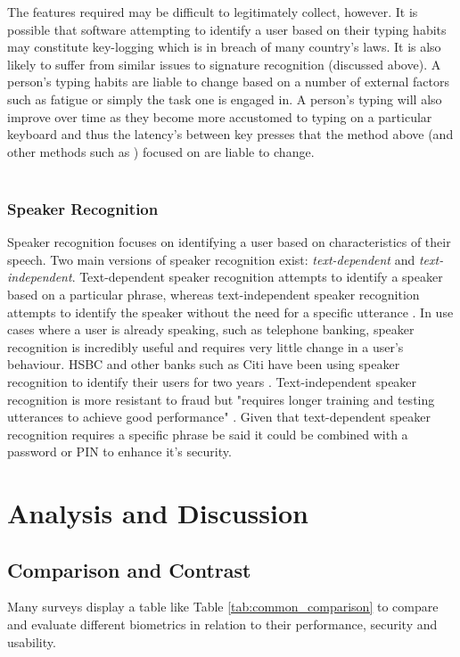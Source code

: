 \documentclass[12pt]{article}
\begin{document}
	The features required may be difficult to legitimately collect, however. It is possible that software attempting to identify a user based on their typing habits may constitute key-logging which is in breach of many country's laws. It is also likely to suffer from similar issues to signature recognition (discussed above). A person's typing habits are liable to change based on a number of external factors such as fatigue or simply the task one is engaged in. A person's typing will also improve over time as they become more accustomed to typing on a particular keyboard and thus the latency's between key presses that the method above (and other methods such as \cite{shepherd_ibm_keystroke_auth1995}) focused on are liable to change.
	\\
	\\
	\subsubsection{Speaker Recognition}
	\label{subsubsect:speaker_recognition}
	Speaker recognition focuses on identifying a user based on characteristics of their speech. Two main versions of speaker recognition exist: \emph{text-dependent} and \emph{text-independent}. Text-dependent speaker recognition attempts to identify a speaker based on a particular phrase, whereas text-independent speaker recognition attempts to identify the speaker without the need for a specific utterance \citep{microsoft_2006}. In use cases where a user is already speaking, such as telephone banking, speaker recognition is incredibly useful and requires very little change in a user's behaviour. HSBC and other banks such as Citi have been using speaker recognition to identify their users for two years \citep{kollewe_2016}. Text-independent speaker recognition is more resistant to fraud \citep{jain2004introduction} but "requires longer training and testing utterances to achieve good performance" \citep{microsoft_2006}. Given that text-dependent speaker recognition requires a specific phrase be said it could be combined with a password or PIN to enhance it's security.
	
	\section{Analysis and Discussion}
	\label{sect_analysis}
	\subsection{Comparison and Contrast}
	Many surveys display a table like Table \ref{tab:common_comparison} to compare and evaluate different biometrics in relation to their performance, security and usability.
\end{document}
